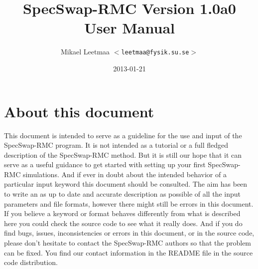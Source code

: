 \documentclass[a4paper, 10pt]{article}
\begin{document}


\title{\LARGE SpecSwap-RMC Version 1.0a0 \\ User Manual}

\date{2013-01-21}

\author{Mikael Leetmaa \hspace{5mm} $<${\tt leetmaa@fysik.su.se}$>$}

\maketitle

\tableofcontents

\section{About this document}
This document is intended to serve as a guideline for the use and input of the
SpecSwap-RMC program. It is not intended as a tutorial or a
full fledged description of the SpecSwap-RMC method. But it is still
our hope that it can serve as a useful guidance to get started with
setting up your first SpecSwap-RMC simulations. And if ever in doubt
about the intended behavior of a particular input keyword this
document should be consulted.
The aim has been to write an as up to date and
accurate description as possible of all the input parameters and file
formats, however there might still be errors
in this document. If you believe a keyword or format behaves
differently from what is described here you could check the source
code to see what it really does. And if you do find bugs, issues,
inconsistencies or errors in this
document, or in the source code, please don't hesitate to contact the SpecSwap-RMC authors so that
the problem can be fixed. You find our contact information in the
README file in the source code distribution.
\end{document}
